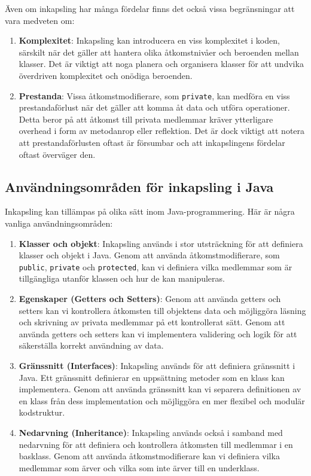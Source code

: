 Även om inkapsling har många fördelar finns det också vissa
begränsningar att vara medveten om:

\begin{enumerate}
\def\labelenumi{\arabic{enumi}.}
\item
  \textbf{Komplexitet}: Inkapsling kan introducera en viss komplexitet i
  koden, särskilt när det gäller att hantera olika åtkomstnivåer och
  beroenden mellan klasser. Det är viktigt att noga planera och
  organisera klasser för att undvika överdriven komplexitet och onödiga
  beroenden.
\item
  \textbf{Prestanda}: Vissa åtkomstmodifierare, som \texttt{private},
  kan medföra en viss prestandaförlust när det gäller att komma åt data
  och utföra operationer. Detta beror på att åtkomst till privata
  medlemmar kräver ytterligare overhead i form av metodanrop eller
  reflektion. Det är dock viktigt att notera att prestandaförlusten
  oftast är försumbar och att inkapslingens fördelar oftast överväger
  den.
\end{enumerate}

\hypertarget{anvuxe4ndningsomruxe5den-fuxf6r-inkapsling-i-java}{%
\subsection{Användningsområden för inkapsling i
Java}\label{anvuxe4ndningsomruxe5den-fuxf6r-inkapsling-i-java}}

Inkapsling kan tillämpas på olika sätt inom Java-programmering. Här är
några vanliga användningsområden:

\begin{enumerate}
\def\labelenumi{\arabic{enumi}.}
\item
  \textbf{Klasser och objekt}: Inkapsling används i stor utsträckning
  för att definiera klasser och objekt i Java. Genom att använda
  åtkomstmodifierare, som \texttt{public}, \texttt{private} och
  \texttt{protected}, kan vi definiera vilka medlemmar som är
  tillgängliga utanför klassen och hur de kan manipuleras.
\item
  \textbf{Egenskaper (Getters och Setters)}: Genom att använda getters
  och setters kan vi kontrollera åtkomsten till objektens data och
  möjliggöra läsning och skrivning av privata medlemmar på ett
  kontrollerat sätt. Genom att använda getters och setters kan vi
  implementera validering och logik för att säkerställa korrekt
  användning av data.
\item
  \textbf{Gränssnitt (Interfaces)}: Inkapsling används för att definiera
  gränssnitt i Java. Ett gränssnitt definierar en uppsättning metoder
  som en klass kan implementera. Genom att använda gränssnitt kan vi
  separera definitionen av en klass från dess implementation och
  möjliggöra en mer flexibel och modulär kodstruktur.
\item
  \textbf{Nedarvning (Inheritance)}: Inkapsling används också i samband
  med nedarvning för att definiera och kontrollera åtkomsten till
  medlemmar i en basklass. Genom att använda åtkomstmodifierare kan vi
  definiera vilka medlemmar som ärver och vilka som inte ärver till en
  underklass.
\end{enumerate}

